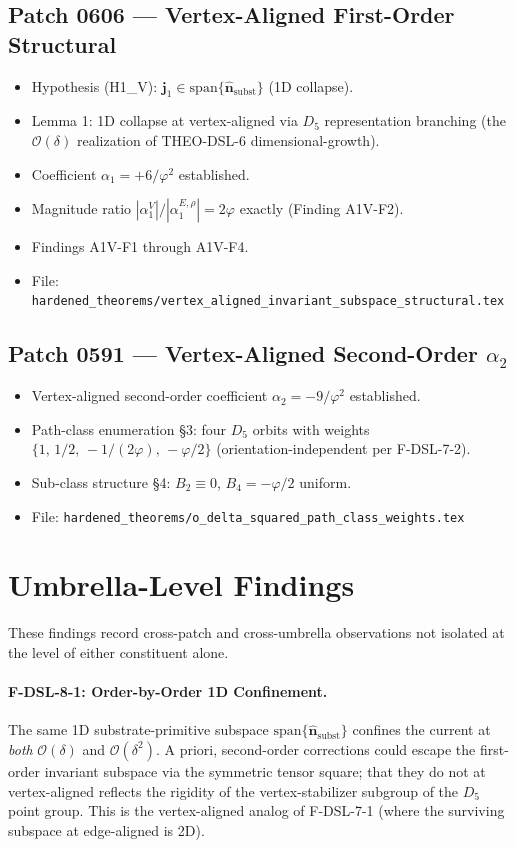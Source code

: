 \documentclass[11pt]{article}
\begin{document}
\subsection*{Patch 0606 --- Vertex-Aligned First-Order Structural}
\begin{itemize}
\item Hypothesis (H1\_V): $\mathbf{j}_1 \in
\mathrm{span}\{\hat{\mathbf{n}}_{\text{subst}}\}$ (1D collapse).
\item Lemma 1: 1D collapse at vertex-aligned via $D_5$ representation
branching (the $\mathcal{O}(\delta)$ realization of THEO-DSL-6
dimensional-growth).
\item Coefficient $\alpha_1 = +6/\varphi^2$ established.
\item Magnitude ratio $|\alpha_1^V|/|\alpha_1^{E,\rho}| = 2\varphi$
exactly (Finding A1V-F2).
\item Findings A1V-F1 through A1V-F4.
\item File:
\texttt{hardened\_theorems/vertex\_aligned\_invariant\_subspace\_structural.tex}
\end{itemize}

\subsection*{Patch 0591 --- Vertex-Aligned Second-Order $\alpha_2$}
\begin{itemize}
\item Vertex-aligned second-order coefficient
$\alpha_2 = -9/\varphi^2$ established.
\item Path-class enumeration §3: four $D_5$ orbits with weights
$\{1,\, 1/2,\, -1/(2\varphi),\, -\varphi/2\}$ (orientation-independent
per F-DSL-7-2).
\item Sub-class structure §4: $B_2 \equiv 0$, $B_4 = -\varphi/2$ uniform.
\item File:
\texttt{hardened\_theorems/o\_delta\_squared\_path\_class\_weights.tex}
\end{itemize}

\section{Umbrella-Level Findings}

These findings record cross-patch and cross-umbrella observations not
isolated at the level of either constituent alone.

\paragraph{F-DSL-8-1: Order-by-Order 1D Confinement.}
The same 1D substrate-primitive subspace
$\mathrm{span}\{\hat{\mathbf{n}}_{\text{subst}}\}$ confines the current
at \emph{both} $\mathcal{O}(\delta)$ and $\mathcal{O}(\delta^2)$. A priori,
second-order corrections could escape the first-order invariant subspace
via the symmetric tensor square; that they do not at vertex-aligned
reflects the rigidity of the vertex-stabilizer subgroup of the $D_5$
point group. This is the vertex-aligned analog of F-DSL-7-1
(where the surviving subspace at edge-aligned is 2D).
\end{document}
